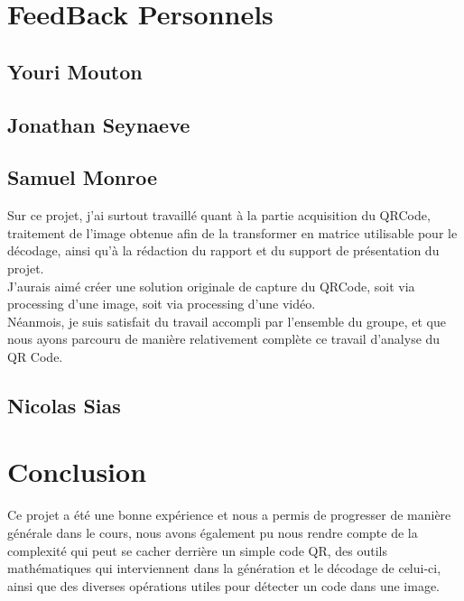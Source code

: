 \documentclass{report}
\begin{document}
	\section{FeedBack Personnels}

		\subsection{Youri Mouton}

		\subsection{Jonathan Seynaeve}

		\subsection{Samuel Monroe}

			Sur ce projet, j'ai surtout travaillé quant à la partie acquisition du QRCode, traitement de l'image obtenue afin de la transformer en matrice utilisable pour le décodage, ainsi qu'à la rédaction du rapport et du support de présentation du projet.\\

			J'aurais aimé créer une solution originale de capture du QRCode, soit via processing d'une image, soit via processing d'une vidéo.\\
			Néanmois, je suis satisfait du travail accompli par l'ensemble du groupe, et que nous ayons parcouru de manière relativement complète ce travail d'analyse du QR Code.\\

		\subsection{Nicolas Sias}

	\section{Conclusion}

	Ce projet a été une bonne expérience et nous a permis de progresser de manière générale dans le cours, nous avons également pu nous rendre compte de la complexité qui peut se cacher derrière un simple code QR, des outils mathématiques qui interviennent dans la génération et le décodage de celui-ci, ainsi que des diverses opérations utiles pour détecter un code dans une image.\\
\end{document}
